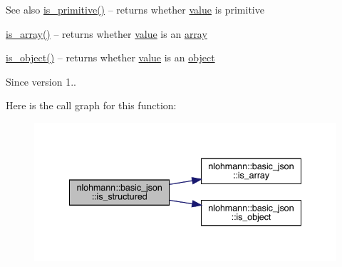 \begin{DoxySeeAlso}{See also}
\mbox{\hyperlink{classnlohmann_1_1basic__json_a6362b88718eb5c6d4fed6a61eed44b95}{is\+\_\+primitive()}} -- returns whether \mbox{\hyperlink{classnlohmann_1_1basic__json_af9c51328fbe1da75eca750be3009917a}{value}} is primitive 

\mbox{\hyperlink{classnlohmann_1_1basic__json_aef9ce5dd2381caee1f8ddcdb5bdd9c65}{is\+\_\+array()}} -- returns whether \mbox{\hyperlink{classnlohmann_1_1basic__json_af9c51328fbe1da75eca750be3009917a}{value}} is an \mbox{\hyperlink{classnlohmann_1_1basic__json_a4a4ec75e4d2845d9bcf7a9e5458e4949}{array}} 

\mbox{\hyperlink{classnlohmann_1_1basic__json_af8f511af124e82e4579f444b4175787c}{is\+\_\+object()}} -- returns whether \mbox{\hyperlink{classnlohmann_1_1basic__json_af9c51328fbe1da75eca750be3009917a}{value}} is an \mbox{\hyperlink{classnlohmann_1_1basic__json_a9f42ee7d10eee2d5a73fd94ca7f767ca}{object}}
\end{DoxySeeAlso}
\begin{DoxySince}{Since}
version 1.. 
\end{DoxySince}
Here is the call graph for this function\+:
\nopagebreak
\begin{figure}[H]
\begin{center}
\leavevmode
\includegraphics[width=341pt]{classnlohmann_1_1basic__json_a9f68a0af820c3ced7f9d17851ce4c22d_cgraph}
\end{center}
\end{figure}
\mbox{\label{classnlohmann_1_1basic__json_aea8c06bb8e632f14cd77632519213d75}} 
